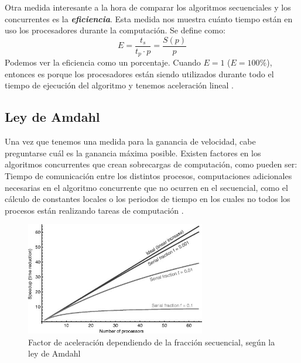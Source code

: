 \vspace{10pt}
Otra medida interesante a la hora de comparar los algoritmos secuenciales y los concurrentes es la 
\textbf{\textit{eficiencia}}. Esta medida nos muestra cuánto tiempo están en uso los procesadores durante la 
computación. Se define como:
\begin{equation}
    E=\frac{t_s}{t_p\cdot p}=\frac{S(p)}{p}
\end{equation}
Podemos ver la eficiencia como un porcentaje. Cuando $E=1$ ($E=100\%$), entonces es porque los procesadores están 
siendo utilizados durante todo el tiempo de ejecución del algoritmo y tenemos aceleración lineal 
\cite{wilkinson_allen_2005}.

\subsection{Ley de Amdahl}

Una vez que tenemos una medida para la ganancia de velocidad, cabe preguntarse cuál es la ganancia máxima posible.
Existen factores en los algoritmos concurrentes que crean sobrecargas de computación, como pueden ser: Tiempo de
comunicación entre los distintos procesos, computaciones adicionales necesarias en el algoritmo concurrente que no
ocurren en el secuencial, como el cálculo de constantes locales o los periodos de tiempo en los cuales no todos los
procesos están realizando tareas de computación \cite{wilkinson_allen_2005}.

\begin{figure}[htbp!]
    \centering
    \includegraphics[width=0.7\textwidth]{img/amdahl.jpg}
    \caption{Factor de aceleración dependiendo de la fracción secuencial, según la ley de Amdahl \cite{Gustafson2011}}
    \label{fig:amdahl}
\end{figure}

